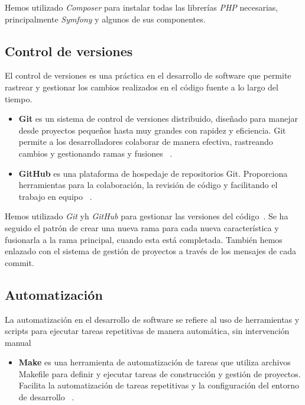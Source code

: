 Hemos utilizado  \textit{Composer} para instalar todas las librerías  \textit{PHP} necesarias, principalmente
\textit{Symfony} y algunos de sus componentes.

\subsection*{Control de versiones}

El control de versiones es una práctica en el desarrollo de software que permite rastrear y gestionar los cambios
realizados en el código fuente a lo largo del tiempo.

\begin{itemize}
    \item \textbf{Git}
    es un sistema de control de versiones distribuido, diseñado para manejar desde proyectos pequeños hasta muy grandes
    con rapidez y eficiencia.
    Git permite a los desarrolladores colaborar de manera efectiva, rastreando cambios y gestionando ramas y fusiones
    ~\cite{url_git}.
    \item \textbf{GitHub} es una plataforma de hospedaje de repositorios Git.
    Proporciona herramientas para la colaboración, la revisión de código y facilitando el trabajo en equipo
    ~\cite{url_github}.
\end{itemize}

Hemos utilizado \textit{Git} yh \textit{GitHub} para gestionar las versiones del código~\cite{url_viu_84_proyecto}.
Se ha seguido el patrón de crear una nueva rama para cada nueva característica y fusionarla a la rama principal, cuando
esta está completada.
También hemos enlazado con el sistema de gestión de proyectos a través de los mensajes de cada commit.

\subsection*{Automatización}

La automatización en el desarrollo de software se refiere al uso de herramientas y scripts para ejecutar tareas
repetitivas de manera automática, sin intervención manual

\begin{itemize}
    \item \textbf{Make}
    es una herramienta de automatización de tareas que utiliza archivos Makefile para definir y ejecutar tareas de
    construcción y gestión de proyectos.
    Facilita la automatización de tareas repetitivas y la configuración del entorno de desarrollo
    ~\cite{url_make}.
\end{itemize}

